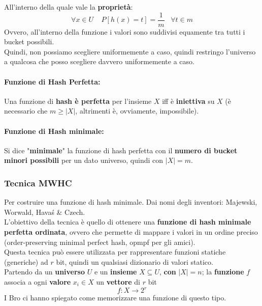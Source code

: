 All'interno della quale vale la \textbf{proprietà}:
$$ \forall x \in U \;\;\;\; P [h(x) = t] = \frac{1}{m} \;\;\; \forall t \in m$$
Ovvero, all'interno della funzione i valori sono suddivisi equamente tra tutti i bucket possibili.\\

Quindi, non possiamo scegliere uniformemente a caso, quindi restringo l'universo a qualcosa che posso scegliere davvero uniformemente a caso.\\

\paragraph{Funzione di Hash Perfetta:} Una funzione di \textbf{hash è perfetta} per l'insieme $X$ iff è \textbf{iniettiva} su $X$ (è necessario che $m \geq |X|$, altrimenti è, ovviamente, impossibile).\\

\paragraph{Funzione di Hash minimale:} Si dice "\textbf{minimale}" la funzione di hash perfetta con il \textbf{numero di bucket minori possibili} per un dato universo, quindi con $|X| = m$.\\

\newpage

\subsubsection{Tecnica MWHC}

Per costruire una funzione di hash minimale. Dai nomi degli inventori: Majewski, Worwald, Hava\'s \& Czech.\\ %

L'obiettivo della tecnica è quello di ottenere una \textbf{funzione di hash minimale perfetta ordinata}, ovvero che permette di mappare i valori in un ordine preciso (order-preserving minimal perfect hash, opmpf per gli amici).\\
Questa tecnica può essere utilizzata per rappresentare funzioni statiche (generiche) ad $r$ bit, quindi un qualsiasi dizionario di valori statico.\\

Partendo da un \textbf{universo} $U$ e un \textbf{insieme} $X \subseteq U$, \textbf{con} $|X| = n$; la \textbf{funzione} $f$ associa a ogni \textbf{valore} $x_i \in X$ un \textbf{vettore} di $r$ bit
$$ f: X \rightarrow 2^r $$
I Bro ci hanno spiegato come memorizzare una funzione di questo tipo.\\

